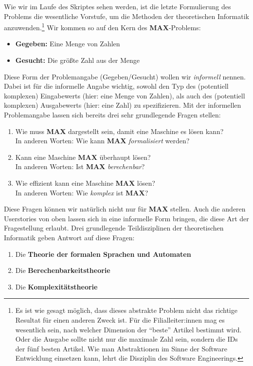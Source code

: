 Wie wir im Laufe des Skriptes sehen werden, ist die letzte Formulierung des Problems die 
wesentliche Vorstufe, um die Methoden der theoretischen Informatik anzuwenden.\footnote{
Es ist wie gesagt möglich,
dass dieses abstrakte Problem nicht das richtige Resultat für einen anderen Zweck ist.
Für die Filialleiter:innen mag es wesentlich sein,
nach welcher Dimension der ``beste'' Artikel bestimmt wird.
Oder die Ausgabe sollte nicht nur die maximale Zahl sein, sondern die IDs der
fünf besten Artikel.
Wie man Abstraktionen im Sinne der Software Entwicklung einsetzen kann,
lehrt die Disziplin des Software Engineerings.}
Wir kommen so auf den Kern des \textbf{MAX}-Problems:
\begin{itemize}
    \item \textbf{Gegeben:} Eine Menge von Zahlen
    \item \textbf{Gesucht:} Die größte Zahl aus der Menge 
\end{itemize}
Diese Form der Problemangabe (Gegeben/Gesucht) wollen wir \emph{informell} nennen.
Dabei ist für die informelle Angabe wichtig,
sowohl den Typ des (potentiell komplexen) Eingabewerts (hier: eine Menge von Zahlen),
als auch des (potentiell komplexen) Ausgabewerts (hier: eine Zahl) zu spezifizieren.
Mit der informellen Problemangabe lassen sich bereits drei sehr grundlegende Fragen stellen:
\begin{enumerate}
    \item Wie muss \textbf{MAX} dargestellt sein, damit eine Maschine es lösen kann?\\ 
        In anderen Worten: Wie kann \textbf{MAX} \emph{formalisiert} werden? 
    \item Kann eine Maschine \textbf{MAX} überhaupt lösen?\\
        In anderen Worten: Ist \textbf{MAX} \emph{berechenbar}?  
    \item Wie effizient kann eine Maschine \textbf{MAX} lösen?\\
        In anderen Worten: Wie \emph{komplex} ist \textbf{MAX}?
\end{enumerate}
Diese Fragen können wir natürlich nicht nur für \textbf{MAX} stellen.
Auch die anderen Userstories von oben lassen sich in eine informelle Form bringen,
die diese Art der Fragestellung erlaubt.
Drei grundlegende Teildisziplinen der theoretischen Informatik
geben Antwort auf diese Fragen:
\begin{enumerate}
    \item Die \textbf{Theorie der formalen Sprachen und Automaten}
    \item Die \textbf{Berechenbarkeitstheorie}
    \item Die \textbf{Komplexitätstheorie}
\end{enumerate}

